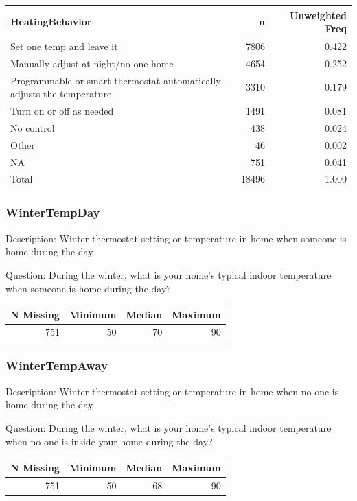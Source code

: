 \documentclass[
]{krantz}
\begin{document}
\begin{tabular}[t]{l|r|r}
\hline
HeatingBehavior & n & Unweighted Freq\\
\hline
Set one temp and leave it & 7806 & 0.422\\
\hline
Manually adjust at night/no one home & 4654 & 0.252\\
\hline
Programmable or smart thermostat automatically adjusts the temperature & 3310 & 0.179\\
\hline
Turn on or off as needed & 1491 & 0.081\\
\hline
No control & 438 & 0.024\\
\hline
Other & 46 & 0.002\\
\hline
NA & 751 & 0.041\\
\hline
Total & 18496 & 1.000\\
\hline
\end{tabular}

\hypertarget{wintertempday}{%
\subsubsection*{WinterTempDay}\label{wintertempday}}


Description: Winter thermostat setting or temperature in home when someone is home during the day

Question: During the winter, what is your home's typical indoor temperature when someone is home during the day?

\begin{tabular}[t]{r|r|r|r}
\hline
N Missing & Minimum & Median & Maximum\\
\hline
751 & 50 & 70 & 90\\
\hline
\end{tabular}

\hypertarget{wintertempaway}{%
\subsubsection*{WinterTempAway}\label{wintertempaway}}


Description: Winter thermostat setting or temperature in home when no one is home during the day

Question: During the winter, what is your home's typical indoor temperature when no one is inside your home during the day?

\begin{tabular}[t]{r|r|r|r}
\hline
N Missing & Minimum & Median & Maximum\\
\hline
751 & 50 & 68 & 90\\
\hline
\end{tabular}
\end{document}
